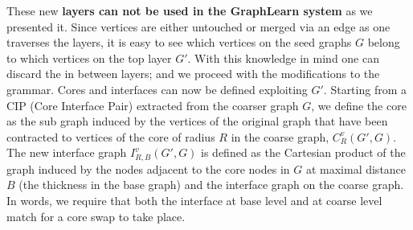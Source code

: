 \documentclass{article}
\begin{document}
These new \textbf{layers can not be used in the GraphLearn system} as we presented it. 
Since vertices are either untouched or merged via an edge as one traverses the layers,
it is easy to see which vertices on the seed graphs $G$ belong to which vertices on the
top layer $G'$. With this knowledge in mind one can discard the in between layers; and 
we proceed with the modifications to the grammar.
Cores and interfaces can now be defined exploiting $G'$.
Starting from a CIP (Core Interface Pair) extracted from the coarser graph $G$, 
we define the core as the sub graph induced by the vertices of
the original graph that have been contracted to vertices of the core of radius
$R$ in the coarse graph, $C_R^v(G',G)$. The new interface graph
$I_{R,B}^v(G',G)$ is defined as the Cartesian product of the graph induced by
the nodes adjacent to the core nodes in $G$ at maximal distance $B$ (the
thickness in the base graph) and the interface graph on the coarse graph. In
words, we require that both the interface at base level and at coarse level
match for a core swap to take place.
\end{document}
